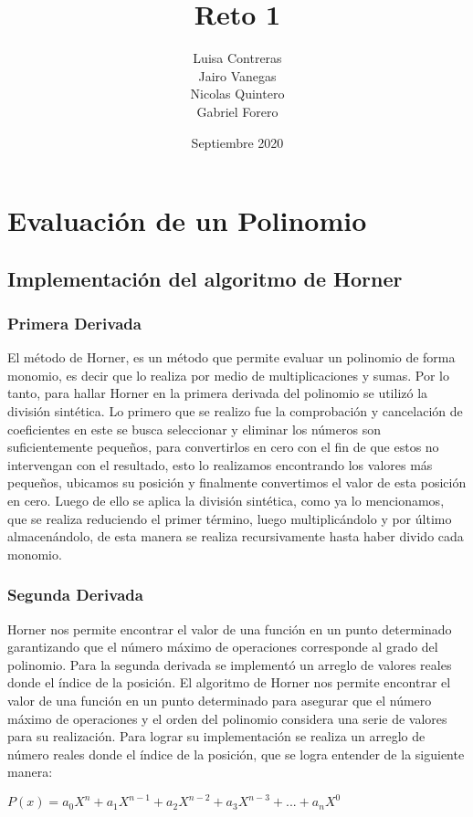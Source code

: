 \documentclass{article}
\title{Reto 1}
\author{Luisa Contreras\\Jairo Vanegas\\ Nicolas Quintero \\Gabriel Forero }
\date{Septiembre 2020}
\begin{document}
\maketitle

\section{Evaluación de un Polinomio}
\subsection{Implementación del algoritmo de Horner }
\subsubsection{Primera Derivada}
El método de Horner, es un método que permite evaluar un polinomio de forma monomio, es decir que lo realiza por medio de multiplicaciones y sumas. Por lo tanto, para hallar Horner en la primera derivada del polinomio se utilizó la división sintética. Lo primero que se realizo fue la comprobación y cancelación de coeficientes en este se busca seleccionar y eliminar los números son suficientemente pequeños, para convertirlos en cero con el fin de que estos no intervengan con el resultado, esto lo realizamos encontrando los valores más pequeños, ubicamos su posición y finalmente convertimos el valor de esta posición en cero. Luego de ello se aplica la división sintética, como ya lo mencionamos, que se realiza reduciendo el primer término, luego multiplicándolo y por último almacenándolo, de esta manera se realiza recursivamente hasta haber divido cada monomio.  
\subsubsection{Segunda Derivada}
Horner nos permite encontrar el valor de una función en un punto determinado garantizando que el número máximo de operaciones corresponde al grado del polinomio. Para la segunda derivada se implementó un arreglo de valores reales donde el índice de la posición.
El algoritmo de Horner nos permite encontrar el valor de una función en un punto determinado para asegurar que el número máximo de operaciones y el orden del polinomio considera una serie de valores para su realización.  Para lograr su implementación se realiza un arreglo de número reales donde el índice de la posición, que se logra entender de la siguiente manera:

$P(x)=a_0X^{n} + a_1X^{n-1}+a_2X^{n-2}+a_3X^{n-3}+...+a_nX^{0}$
\end{document}
